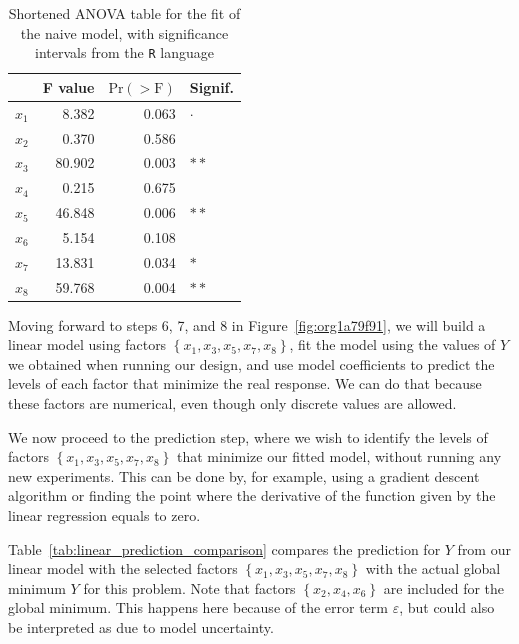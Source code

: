 \documentclass[conference]{IEEEtran}
\begin{document}
\begin{table}[t]
\centering
\caption{Shortened ANOVA table for the fit of the naive model, with significance intervals from the \texttt{R} language}
\label{tab:anova_linear}
\begingroup\small
\begin{tabular}{lrrl}
  \toprule
 & F value & $\text{Pr}(>\text{F})$ & Signif. \\
  \midrule
$x_1$ & 8.382 & 0.063 & $\cdot$ \\
  $x_2$ & 0.370 & 0.586 &   \\
  $x_3$ & 80.902 & 0.003 & $**$ \\
  $x_4$ & 0.215 & 0.675 &   \\
  $x_5$ & 46.848 & 0.006 & $**$ \\
  $x_6$ & 5.154 & 0.108 &   \\
  $x_7$ & 13.831 & 0.034 & $*$ \\
  $x_8$ & 59.768 & 0.004 & $**$ \\
   \bottomrule
\end{tabular}
\endgroup
\end{table}

Moving forward to steps 6, 7, and 8 in Figure~\ref{fig:org1a79f91}, we
will build a linear model using factors \(\left\{x_1,x_3,x_5,x_7,x_8\right\}\),
fit the model using the values of \(Y\) we obtained when running our design, and
use model coefficients to predict the levels of each factor that minimize the
real response. We can do that because these factors are numerical, even though
only discrete values are allowed.

We now proceed to the prediction step, where we wish to identify the levels of
factors \(\left\{x_1,x_3,x_5,x_7,x_8\right\}\) that minimize our fitted model,
without running any new experiments. This can be done by, for example, using a
gradient descent algorithm or finding the point where the derivative of the
function given by the linear regression equals to zero.

Table~\ref{tab:linear_prediction_comparison} compares the prediction for
\(Y\) from our linear model with the selected factors
\(\left\{x_1,x_3,x_5,x_7,x_8\right\}\) with the actual global minimum \(Y\) for this
problem. Note that factors \(\left\{x_2,x_4,x_6\right\}\) are included for the
global minimum. This happens here because of the error term \(\varepsilon\), but
could also be interpreted as due to model uncertainty.
\end{document}

